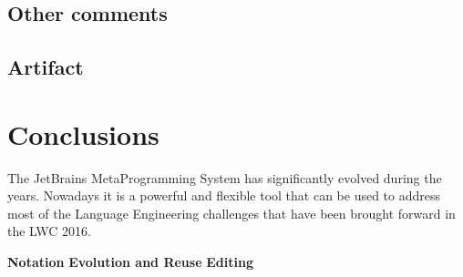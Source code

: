 \documentclass[preprint,numbers,10pt]{sigplanconf}
\begin{document}
\subsection{Other comments}

\subsection{Artifact}

%
%

\section{Conclusions}

The JetBrains MetaProgramming System has significantly evolved during the years. Nowadays it is a powerful and flexible tool that can be used to address most of the Language Engineering challenges that have been brought forward in the LWC 2016.

\textbf{Notation}
\textbf{Evolution and Reuse}
\textbf{Editing}



\end{document}
